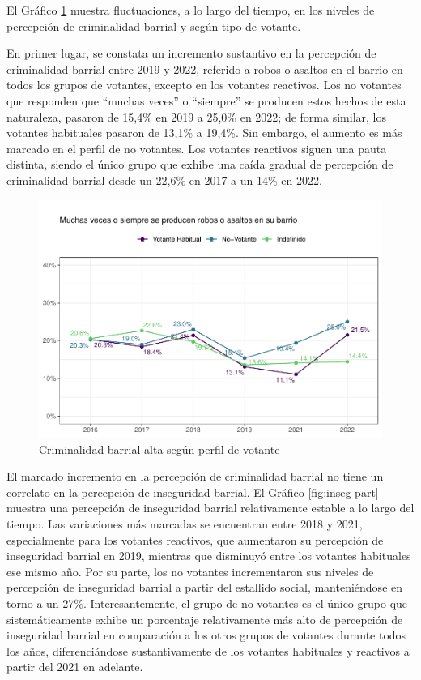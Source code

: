 \documentclass[
  12pt,
]{book}
\begin{document}
El Gráfico \ref{fig:crim-olas-part} muestra fluctuaciones, a lo largo del tiempo, en los niveles de percepción de criminalidad barrial y según tipo de votante.

En primer lugar, se constata un incremento sustantivo en la percepción de criminalidad barrial entre 2019 y 2022, referido a robos o asaltos en el barrio en todos los grupos de votantes, excepto en los votantes reactivos. Los no votantes que responden que ``muchas veces'' o ``siempre'' se producen estos hechos de esta naturaleza, pasaron de 15,4\% en 2019 a 25,0\% en 2022; de forma similar, los votantes habituales pasaron de 13,1\% a 19,4\%. Sin embargo, el aumento es más marcado en el perfil de no votantes. Los votantes reactivos siguen una pauta distinta, siendo el único grupo que exhibe una caída gradual de percepción de criminalidad barrial desde un 22,6\% en 2017 a un 14\% en 2022.

\begin{figure}

{\centering \includegraphics{reporte-elsoc_files/figure-latex/crim-olas-part-1} 

}

\caption{Criminalidad barrial alta según perfil de votante}\label{fig:crim-olas-part}
\end{figure}

El marcado incremento en la percepción de criminalidad barrial no tiene un correlato en la percepción de inseguridad barrial. El Gráfico \ref{fig:inseg-part} muestra una percepción de inseguridad barrial relativamente estable a lo largo del tiempo. Las variaciones más marcadas se encuentran entre 2018 y 2021, especialmente para los votantes reactivos, que aumentaron su percepción de inseguridad barrial en 2019, mientras que disminuyó entre los votantes habituales ese mismo año. Por su parte, los no votantes incrementaron sus niveles de percepción de inseguridad barrial a partir del estallido social, manteniéndose en torno a un 27\%. Interesantemente, el grupo de no votantes es el único grupo que sistemáticamente exhibe un porcentaje relativamente más alto de percepción de inseguridad barrial en comparación a los otros grupos de votantes durante todos los años, diferenciándose sustantivamente de los votantes habituales y reactivos a partir del 2021 en adelante.
\end{document}
